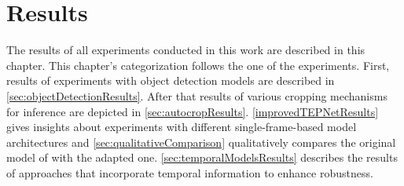 \chapter{Results}
\label{sec:results}


The results of all experiments conducted in this work are described in this chapter.
This chapter's categorization follows the one of the experiments.
First, results of experiments with object detection models are described in \autoref{sec:objectDetectionResults}.
After that results of various cropping mechanisms for inference are depicted in \autoref{sec:autocropResults}.
\autoref{improvedTEPNetResults} gives insights about experiments with different single-frame-based model architectures and \autoref{sec:qualitativeComparison} qualitatively compares the original model of \cite{tepNet2024} with the adapted one.
\autoref{sec:temporalModelsResults} describes the results of approaches that incorporate temporal information to enhance robustness.












